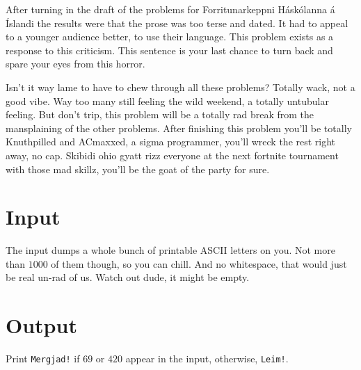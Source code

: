 
After turning in the draft of the problems for
Forritunarkeppni Háskólanna á Íslandi the results were that
the prose was too terse and dated. It had to appeal to a 
younger audience better, to use their language. This problem
exists as a response to this criticism. This sentence is
your last chance to turn back and spare your eyes from this
horror.

Isn't it way lame to have to chew through all these
problems? Totally wack, not a good vibe.
Way too many still feeling the wild weekend, a totally
untubular feeling.
But don't trip, this problem will be a totally rad break
from the mansplaining of the other problems.
After finishing this problem you'll be totally Knuthpilled
and ACmaxxed, a sigma programmer, you'll wreck the rest
right away, no cap.
Skibidi ohio gyatt rizz everyone at the next fortnite
tournament with those mad skillz, you'll be the goat of the
party for sure.

\section*{Input}

The input dumps a whole bunch of printable ASCII letters on
you. Not more than $1000$ of them though, so you can chill.
And no whitespace, that would just be real un-rad of us.
Watch out dude, it might be empty.

\section*{Output}

Print \texttt{Mergjad!} if $69$ or $420$ appear in the input,
otherwise, \texttt{Leim!}.
